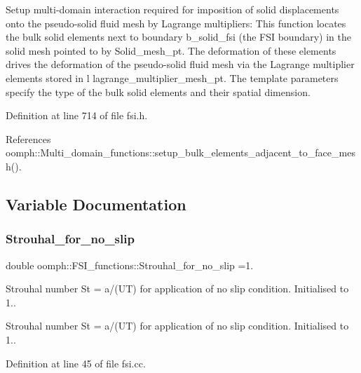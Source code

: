 Setup multi-\/domain interaction required for imposition of solid displacements onto the pseudo-\/solid fluid mesh by Lagrange multipliers\+: This function locates the bulk solid elements next to boundary b\+\_\+solid\+\_\+fsi (the F\+SI boundary) in the solid mesh pointed to by Solid\+\_\+mesh\+\_\+pt. The deformation of these elements drives the deformation of the pseudo-\/solid fluid mesh via the Lagrange multiplier elements stored in l lagrange\+\_\+multiplier\+\_\+mesh\+\_\+pt. The template parameters specify the type of the bulk solid elements and their spatial dimension. 



Definition at line 714 of file fsi.\+h.



References oomph\+::\+Multi\+\_\+domain\+\_\+functions\+::setup\+\_\+bulk\+\_\+elements\+\_\+adjacent\+\_\+to\+\_\+face\+\_\+mesh().



\subsection{Variable Documentation}
\mbox{\label{namespaceoomph_1_1FSI__functions_aa213854665524b0720b63a115ef57fd8}} 
\subsubsection{\texorpdfstring{Strouhal\+\_\+for\+\_\+no\+\_\+slip}{Strouhal\_for\_no\_slip}}
{\footnotesize\ttfamily double oomph\+::\+F\+S\+I\+\_\+functions\+::\+Strouhal\+\_\+for\+\_\+no\+\_\+slip =1.}



Strouhal number St = a/(UT) for application of no slip condition. Initialised to 1.. 

Strouhal number St = a/(UT) for application of no slip condition. Initialised to 1.. 

Definition at line 45 of file fsi.\+cc.

